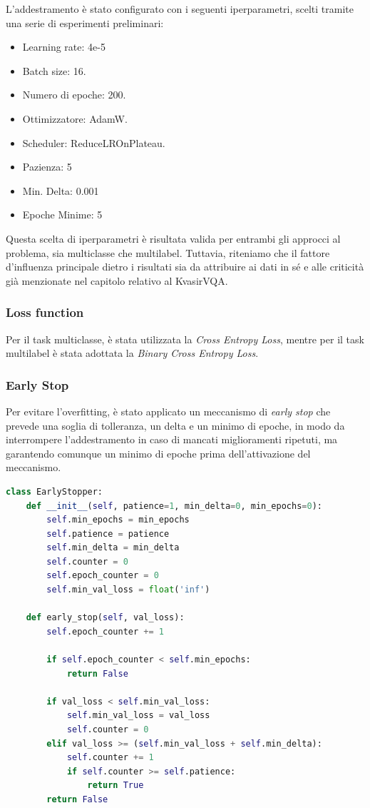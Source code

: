 \documentclass[../main.tex]{subfiles}
\begin{document}
L'addestramento è stato configurato con i seguenti iperparametri, scelti tramite una serie di esperimenti preliminari:

\begin{itemize}
    \item Learning rate: 4e-5
    \item Batch size: 16.
    \item Numero di epoche: 200.
    \item Ottimizzatore: AdamW.
    \item Scheduler: ReduceLROnPlateau.
    \item Pazienza: 5
    \item Min. Delta: 0.001
    \item Epoche Minime: 5
\end{itemize}

Questa scelta di iperparametri è risultata valida per entrambi gli approcci al problema, sia multiclasse che multilabel. 
Tuttavia, riteniamo che il fattore d'influenza principale dietro i risultati sia da attribuire ai dati in sé e alle criticità già menzionate nel capitolo relativo al KvasirVQA.

\subsubsection{Loss function}

Per il task multiclasse, è stata utilizzata la \textit{Cross Entropy Loss}, mentre per il task multilabel è stata adottata la \textit{Binary Cross Entropy Loss}.

\subsubsection{Early Stop}

Per evitare l'overfitting, è stato applicato un meccanismo di \textit{early stop} che prevede una soglia di tolleranza, un delta e un minimo di epoche, in modo da interrompere l'addestramento in caso di mancati miglioramenti ripetuti, ma garantendo comunque un minimo di epoche prima dell'attivazione del meccanismo.

\newpage

\begin{lstlisting}[language=Python]
class EarlyStopper: 
    def __init__(self, patience=1, min_delta=0, min_epochs=0):
        self.min_epochs = min_epochs
        self.patience = patience
        self.min_delta = min_delta
        self.counter = 0
        self.epoch_counter = 0
        self.min_val_loss = float('inf')
        
    def early_stop(self, val_loss):
        self.epoch_counter += 1
        
        if self.epoch_counter < self.min_epochs:
            return False
        
        if val_loss < self.min_val_loss:
            self.min_val_loss = val_loss
            self.counter = 0
        elif val_loss >= (self.min_val_loss + self.min_delta):
            self.counter += 1
            if self.counter >= self.patience:
                return True
        return False
\end{lstlisting}
\end{document}
